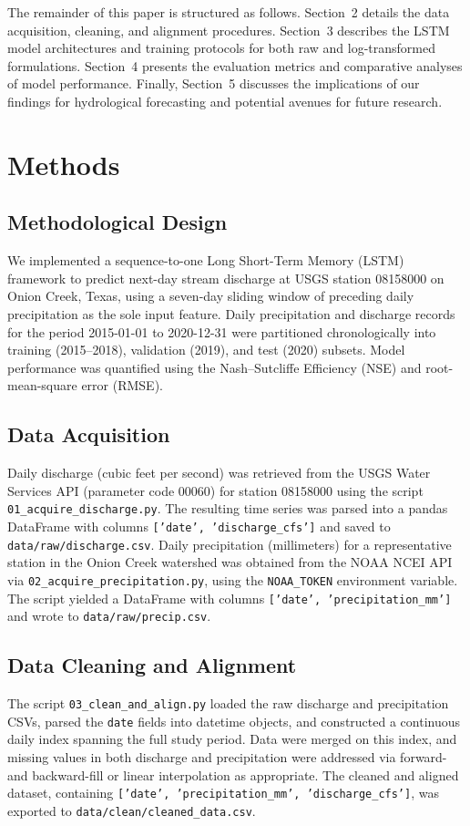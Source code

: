 \documentclass[preprint,12pt]{elsarticle}
\begin{document}
The remainder of this paper is structured as follows. Section~2 details the data acquisition, cleaning, and alignment procedures. Section~3 describes the LSTM model architectures and training protocols for both raw and log-transformed formulations. Section~4 presents the evaluation metrics and comparative analyses of model performance. Finally, Section~5 discusses the implications of our findings for hydrological forecasting and potential avenues for future research.

\section{Methods}

\subsection{Methodological Design}
We implemented a sequence-to-one Long Short-Term Memory (LSTM) framework to predict next-day stream discharge at USGS station 08158000 on Onion Creek, Texas, using a seven-day sliding window of preceding daily precipitation as the sole input feature. Daily precipitation and discharge records for the period 2015-01-01 to 2020-12-31 were partitioned chronologically into training (2015--2018), validation (2019), and test (2020) subsets. Model performance was quantified using the Nash--Sutcliffe Efficiency (NSE) and root-mean-square error (RMSE).

\subsection{Data Acquisition}
Daily discharge (cubic feet per second) was retrieved from the USGS Water Services API (parameter code 00060) for station 08158000 using the script \texttt{01\_acquire\_discharge.py}. The resulting time series was parsed into a pandas DataFrame with columns \texttt{['date', 'discharge\_cfs']} and saved to \texttt{data/raw/discharge.csv}. Daily precipitation (millimeters) for a representative station in the Onion Creek watershed was obtained from the NOAA NCEI API via \texttt{02\_acquire\_precipitation.py}, using the \texttt{NOAA\_TOKEN} environment variable. The script yielded a DataFrame with columns \texttt{['date', 'precipitation\_mm']} and wrote to \texttt{data/raw/precip.csv}.

\subsection{Data Cleaning and Alignment}
The script \texttt{03\_clean\_and\_align.py} loaded the raw discharge and precipitation CSVs, parsed the \texttt{date} fields into datetime objects, and constructed a continuous daily index spanning the full study period. Data were merged on this index, and missing values in both discharge and precipitation were addressed via forward- and backward-fill or linear interpolation as appropriate. The cleaned and aligned dataset, containing \texttt{['date', 'precipitation\_mm', 'discharge\_cfs']}, was exported to \texttt{data/clean/cleaned\_data.csv}.
\end{document}

